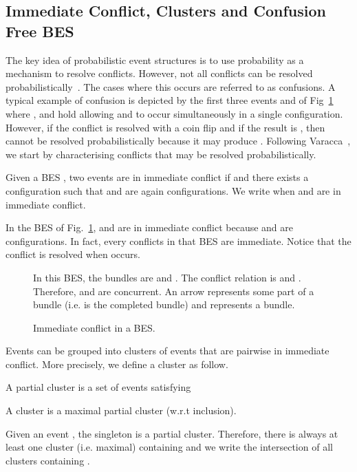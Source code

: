 \documentclass{llncs}
\newcommand{\<}{\langle}
\renewcommand{\>}{\rangle}
\begin{document}
\subsection{Immediate Conflict, Clusters and Confusion Free BES}

The key idea of probabilistic event structures is to use probability as a mechanism to resolve conflicts. However, not all conflicts can be resolved probabilistically~\cite{Kat96}. The cases where this occurs are referred to as confusions. A typical example of confusion is depicted by the first three events  and  of Fig~\ref{fig:example} where ,  and  hold allowing  and  to occur simultaneously in a single configuration. However, if the conflict  is resolved with a coin flip and if the result is , then  cannot be resolved probabilistically because it may produce . Following Varacca~\cite{Var03}, we start by characterising conflicts that may be resolved probabilistically.

\begin{definition}\label{def:immediate-conflict} 
Given a BES , two events  are in immediate conflict if  and there exists a configuration  such that  and  are again configurations. We write  when  and  are in immediate conflict.
\end{definition}

\begin{example}
In the BES of Fig.~\ref{fig:example},  and  are in immediate conflict because  and  are configurations. In fact, every conflicts in that BES are immediate. Notice that the conflict  is resolved  when  occurs. 
\begin{figure}[h!]

In this BES, the bundles are  and . The conflict relation is  and . Therefore,  and  are concurrent. An arrow  represents some part of a bundle (i.e.  is the completed bundle) and  represents a bundle.
\caption{Immediate conflict in a BES.}\label{fig:example}
\end{figure}
\end{example}


Events can be grouped into clusters of events that are pairwise in immediate conflict. More precisely, we define a cluster as follow.
\begin{definition}\label{def:cluster}
A partial cluster is a set of events  satisfying

A cluster is a maximal partial cluster (w.r.t inclusion).
\end{definition}


Given an event , the singleton  is a partial cluster. Therefore, there is always at least one cluster (i.e. maximal) containing  and we write  the intersection of all clusters containing . 
\end{document}

